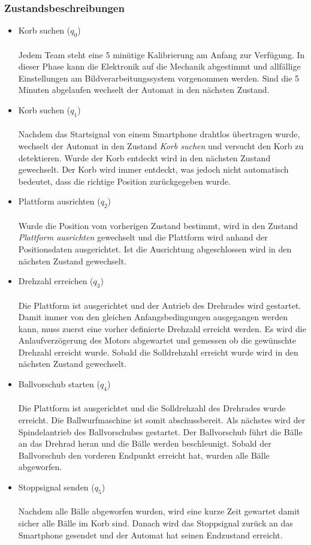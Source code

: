\subsubsection{Zustandsbeschreibungen}
\begin{itemize}
	
	\item Korb suchen ($q_{0}$) \\ \\
		Jedem Team steht eine 5 minütige Kalibrierung am Anfang zur Verfügung. In dieser Phase kann die Elektronik auf die Mechanik abgestimmt und allfällige Einstellungen am Bildverarbeitungssystem vorgenommen werden. Sind die 5 Minuten abgelaufen wechselt der Automat in den nächsten Zustand.
		
	\item Korb suchen ($q_{1}$) \\ \\
		  Nachdem das Startsignal von einem Smartphone drahtlos übertragen wurde, wechselt der Automat in den Zustand \textit{Korb suchen} und versucht den Korb zu detektieren. Wurde der Korb entdeckt wird in den nächsten Zustand gewechselt. Der Korb wird immer entdeckt, was jedoch nicht automatisch bedeutet, dass die richtige Position zurückgegeben wurde.
		  
	\item Plattform ausrichten ($q_{2}$) \\ \\
		  Wurde die Position vom vorherigen Zustand bestimmt, wird in den Zustand \textit{Plattform ausrichten} gewechselt und die Plattform wird anhand der Positionsdaten ausgerichtet. Ist die Ausrichtung abgeschlossen wird in den nächsten Zustand gewechselt.
		  
	\item Drehzahl erreichen ($q_{3}$) \\ \\
		  Die Plattform ist ausgerichtet und der Antrieb des Drehrades wird gestartet. Damit immer von den gleichen Anfangsbedingungen ausgegangen werden kann, muss zuerst eine vorher definierte Drehzahl erreicht werden. Es wird die Anlaufverzögerung des Motors abgewartet und gemessen ob die gewünschte Drehzahl erreicht wurde. Sobald die Solldrehzahl erreicht wurde wird in den nächsten Zustand gewechselt.
		  
	\item Ballvorschub starten ($q_{4}$) \\ \\
		  Die Plattform ist ausgerichtet und die Solldrehzahl des Drehrades wurde erreicht. Die Ballwurfmaschine ist somit abschussbereit. Als nächstes wird der Spindelantrieb des Ballvorschubes gestartet. Der Ballvorschub führt die Bälle an das Drehrad heran und die Bälle werden beschleunigt. Sobald der Ballvorschub den vorderen Endpunkt erreicht hat, wurden alle Bälle abgeworfen.
		  
	\item Stoppsignal senden ($q_{5}$) \\ \\
		  Nachdem alle Bälle abgeworfen wurden, wird eine kurze Zeit gewartet damit sicher alle Bälle im Korb sind. Danach wird das Stoppsignal zurück an das Smartphone gesendet und der Automat hat seinen Endzustand erreicht.	  
		  
\end{itemize}
